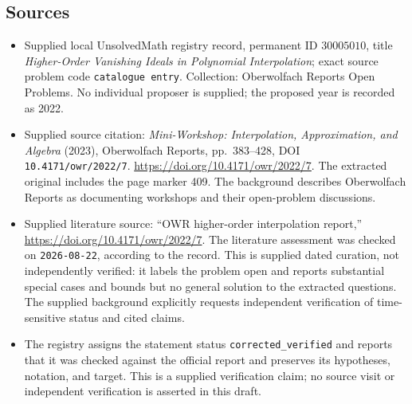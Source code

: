 \documentclass[11pt]{article}
\begin{document}
\subsection{Sources}
\begin{itemize}
\item Supplied local UnsolvedMath registry record, permanent ID \(30005010\), title \emph{Higher-Order Vanishing Ideals in Polynomial Interpolation}; exact source problem code \texttt{catalogue entry}. Collection: Oberwolfach Reports Open Problems. No individual proposer is supplied; the proposed year is recorded as 2022.
\item Supplied source citation: \emph{Mini-Workshop: Interpolation, Approximation, and Algebra} (2023), Oberwolfach Reports, pp.\ 383--428, DOI \texttt{10.4171/owr/2022/7}. \url{https://doi.org/10.4171/owr/2022/7}. The extracted original includes the page marker 409. The background describes Oberwolfach Reports as documenting workshops and their open-problem discussions.
\item Supplied literature source: ``OWR higher-order interpolation report,'' \url{https://doi.org/10.4171/owr/2022/7}. The literature assessment was checked on \texttt{2026-08-22}, according to the record. This is supplied dated curation, not independently verified: it labels the problem open and reports substantial special cases and bounds but no general solution to the extracted questions. The supplied background explicitly requests independent verification of time-sensitive status and cited claims.
\item The registry assigns the statement status \texttt{corrected\_verified} and reports that it was checked against the official report and preserves its hypotheses, notation, and target. This is a supplied verification claim; no source visit or independent verification is asserted in this draft.
\end{itemize}
\end{document}
